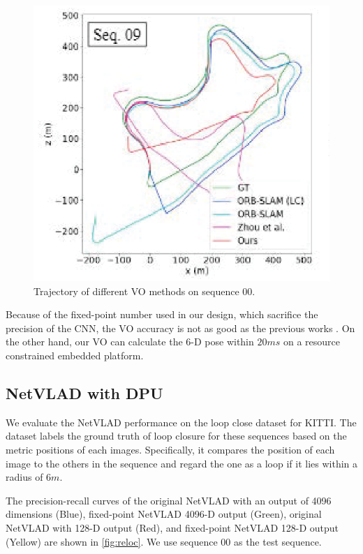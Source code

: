 \begin{figure}[t]
    \centering  
    \includegraphics[width=0.75\linewidth]{fig/VO.eps}
    \caption{Trajectory of different VO methods on sequence 00.}
    \label{fig:VO}
\end{figure}


Because of the fixed-point number used in our design, which sacrifice the precision of the CNN, the VO accuracy is not as good as the previous works \cite{Mur-Artal:2017281,Zhan:2018e92}. On the other hand, our VO can calculate the 6-D pose within $20ms$ on a resource constrained embedded platform.

\subsection{NetVLAD with DPU}

We evaluate the NetVLAD performance on the loop close dataset for KITTI\cite{KITTIGroundTruth}.
The dataset labels the ground truth of loop closure for these sequences based on the metric positions of each images. Specifically, it compares the position of each image to the others in the sequence and regard the one as a loop if it lies within a radius of $6m$.

The precision-recall curves of the original NetVLAD with an output of 4096 dimensions (Blue), fixed-point NetVLAD 4096-D output (Green), original NetVLAD with 128-D output (Red), and fixed-point NetVLAD 128-D output (Yellow) are shown in \cref{fig:reloc}. We use sequence 00 as the test sequence.


